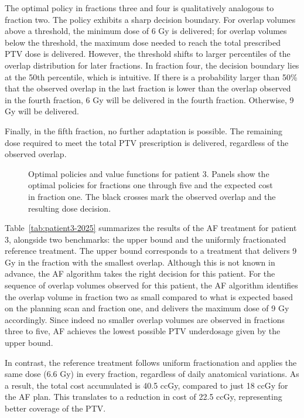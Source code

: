 \documentclass[11pt]{article}
\begin{document}
The optimal policy in fractions three and four is qualitatively analogous to fraction two. The policy exhibits a sharp decision boundary. For overlap volumes above a threshold, the minimum dose of 6 Gy is delivered; for overlap volumes below the threshold, the maximum dose needed to reach the total prescribed PTV dose is delivered. However, the threshold shifts to larger percentiles of the overlap distribution for later fractions. In fraction four, the decision boundary lies at the 50th percentile, which is intuitive. If there is a probability larger than 50\% that the observed overlap in the last fraction is lower than the overlap observed in the fourth fraction, 6 Gy will be delivered in the fourth fraction. Otherwise, 9 Gy will be delivered.

Finally, in the fifth fraction, no further adaptation is possible. The remaining dose required to meet the total PTV prescription is delivered, regardless of the observed overlap.

\begin{figure}[ht]
\centering
{}
\caption{Optimal policies and value functions for patient 3. Panels show the optimal policies for fractions one through five and the expected cost in fraction one. The black crosses mark the observed overlap and the resulting dose decision.}
\label{fig:patient3-policy}
\end{figure}

Table~\ref{tab:patient3-2025} summarizes the results of the AF treatment for patient 3, alongside two benchmarks: the upper bound and the uniformly fractionated reference treatment. The upper bound corresponds to a treatment that delivers 9 Gy in the fraction with the smallest overlap. Although this is not known in advance, the AF algorithm takes the right decision for this patient. For the sequence of overlap volumes observed for this patient, the AF algorithm identifies the overlap volume in fraction two as small compared to what is expected based on the planning scan and fraction one, and delivers the maximum dose of 9 Gy accordingly. Since indeed no smaller overlap volumes are observed in fractions three to five, AF achieves the lowest possible PTV underdosage given by the upper bound.

In contrast, the reference treatment follows uniform fractionation and applies the same dose (6.6 Gy) in every fraction, regardless of daily anatomical variations. As a result, the total cost accumulated is 40.5 ccGy, compared to just 18 ccGy for the AF plan. This translates to a reduction in cost of 22.5 ccGy, representing better coverage of the PTV.
\end{document}
